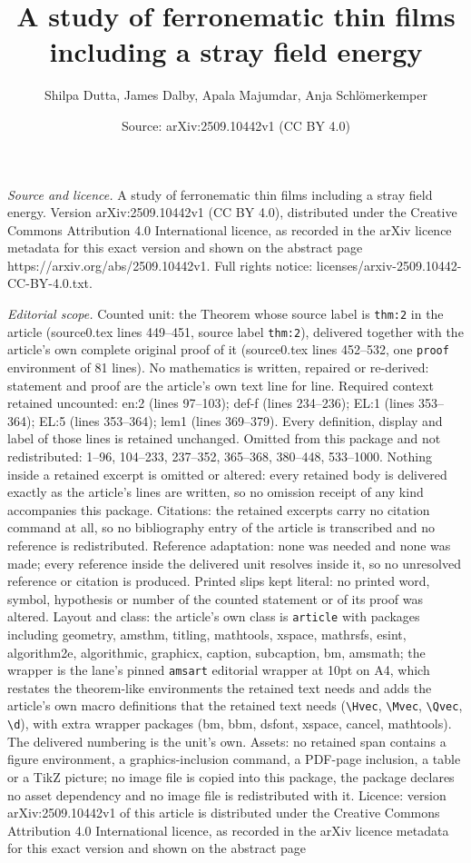\documentclass[10pt,a4paper]{amsart}
\title[A study of ferronematic thin films including a stray field e]{A study of ferronematic thin films including a stray field energy}
\author{Shilpa Dutta, James Dalby, Apala Majumdar, Anja Schl\"omerkemper}
\date{Source: arXiv:2509.10442v1 (CC BY 4.0)}
\begin{document}
\maketitle

\noindent\emph{Source and licence.} A study of ferronematic thin films including a stray field energy. Version arXiv:2509.10442v1 (CC BY 4.0), distributed under the Creative Commons Attribution 4.0 International licence, as recorded in the arXiv licence metadata for this exact version and shown on the abstract page https://arxiv.org/abs/2509.10442v1. Full rights notice: licenses/arxiv-2509.10442-CC-BY-4.0.txt.\par\smallskip

\noindent\textit{Editorial scope.} Counted unit: the Theorem whose source label is \texttt{thm:2} in the article (source0.tex lines 449--451, source label \texttt{thm:2}), delivered together with the article's own complete original proof of it (source0.tex lines 452--532, one \texttt{proof} environment of 81 lines). No mathematics is written, repaired or re-derived: statement and proof are the article's own text line for line. Required context retained uncounted: en:2 (lines 97--103); def-f (lines 234--236); EL:1 (lines 353--364); EL:5 (lines 353--364); lem1 (lines 369--379). Every definition, display and label of those lines is retained unchanged. Omitted from this package and not redistributed: 1--96, 104--233, 237--352, 365--368, 380--448, 533--1000. Nothing inside a retained excerpt is omitted or altered: every retained body is delivered exactly as the article's lines are written, so no omission receipt of any kind accompanies this package. Citations: the retained excerpts carry no citation command at all, so no bibliography entry of the article is transcribed and no reference is redistributed. Reference adaptation: none was needed and none was made; every reference inside the delivered unit resolves inside it, so no unresolved reference or citation is produced. Printed slips kept literal: no printed word, symbol, hypothesis or number of the counted statement or of its proof was altered. Layout and class: the article's own class is \texttt{article} with packages including geometry, amsthm, titling, mathtools, xspace, mathrsfs, esint, algorithm2e, algorithmic, graphicx, caption, subcaption, bm, amsmath; the wrapper is the lane's pinned \texttt{amsart} editorial wrapper at 10pt on A4, which restates the theorem-like environments the retained text needs and adds the article's own macro definitions that the retained text needs (\texttt{\textbackslash Hvec}, \texttt{\textbackslash Mvec}, \texttt{\textbackslash Qvec}, \texttt{\textbackslash d}), with extra wrapper packages (bm, bbm, dsfont, xspace, cancel, mathtools). The delivered numbering is the unit's own. Assets: no retained span contains a figure environment, a graphics-inclusion command, a PDF-page inclusion, a table or a TikZ picture; no image file is copied into this package, the package declares no asset dependency and no image file is redistributed with it. Licence: version arXiv:2509.10442v1 of this article is distributed under the Creative Commons Attribution 4.0 International licence, as recorded in the arXiv licence metadata for this exact version and shown on the abstract page 
\end{document}

